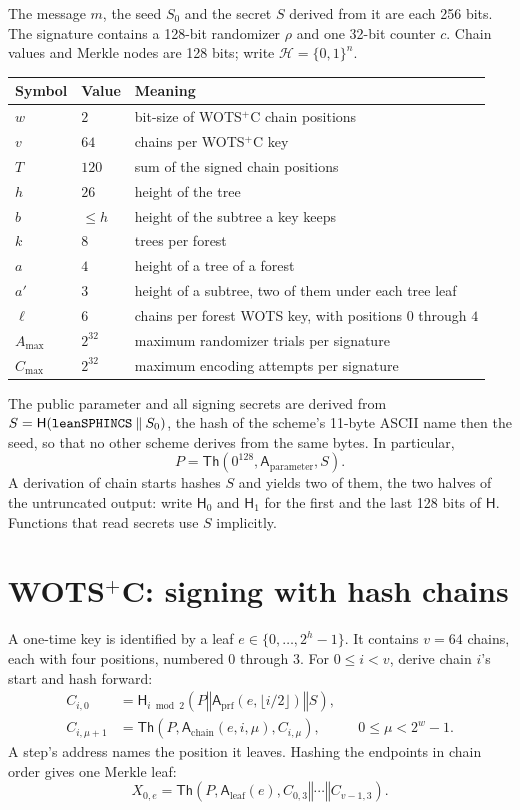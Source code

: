 \documentclass[11pt]{article}
\theoremstyle{plain}
\theoremstyle{definition}
\newcommand{\bits}[1]{\{0,1\}^{#1}}
\newcommand{\Th}{\mathsf{Th}}
\newcommand{\hash}{\mathsf{H}}
\newcommand{\concat}{\mathbin\Vert}
\newcommand{\addr}{\mathsf{A}}
\newcommand{\amax}{A_{\max}}
\newcommand{\cmax}{C_{\max}}
\begin{document}
The message $m$, the seed $S_0$ and the secret $S$ derived from it are each 256 bits. The signature contains a 128-bit randomizer $\rho$ and one 32-bit counter $c$. Chain values and Merkle nodes are 128 bits; write $\mathcal H=\bits n$.

\begin{center}
\begin{tabular}{@{}lll@{}}
\toprule
Symbol & Value & Meaning\\
\midrule
$w$ & $2$ & bit-size of WOTS$^+$C chain positions\\
$v$ & $64$ & chains per WOTS$^+$C key\\
$T$ & $120$ & sum of the signed chain positions\\
$h$ & $26$ & height of the tree\\
$b$ & $\leq h$ & height of the subtree a key keeps\\
$k$ & $8$ & trees per forest\\
$a$ & $4$ & height of a tree of a forest\\
$a'$ & $3$ & height of a subtree, two of them under each tree leaf\\
$\ell$ & $6$ & chains per forest WOTS key, with positions $0$ through $4$\\
$\amax$ & $2^{32}$ & maximum randomizer trials per signature\\
$\cmax$ & $2^{32}$ & maximum encoding attempts per signature\\
\bottomrule
\end{tabular}
\end{center}

The public parameter and all signing secrets are derived from $S=\hash(\text{\texttt{leanSPHINCS}}\concat S_0)$, the hash of the scheme's 11-byte ASCII name then the seed, so that no other scheme derives from the same bytes. In particular,
\[
  P=\Th\!\left(0^{128},\addr_{\mathrm{parameter}},S\right).
\]
A derivation of chain starts hashes $S$ and yields two of them, the two halves of the untruncated output: write $\hash_0$ and $\hash_1$ for the first and the last 128 bits of $\hash$. Functions that read secrets use $S$ implicitly.

\section{\texorpdfstring{WOTS$^+$C}{WOTS+C}: signing with hash chains}
\label{sec:ots}

A one-time key is identified by a leaf $e\in\{0,\ldots,2^h-1\}$. It contains $v=64$ chains, each with four positions, numbered $0$ through $3$. For $0\leq i<v$, derive chain $i$'s start and hash forward:
\[
\begin{aligned}
  C_{i,0}&=\hash_{i\bmod2}\!\left(P\concat\addr_{\mathrm{prf}}(e,\lfloor i/2\rfloor)\concat S\right),\\
  C_{i,\mu+1}&=\Th\!\left(P,\addr_{\mathrm{chain}}(e,i,\mu),C_{i,\mu}\right),
    &&0\leq\mu<2^w-1.
\end{aligned}
\]
A step's address names the position it leaves. Hashing the endpoints in chain order gives one Merkle leaf:
\[
  X_{0,e}=\Th\!\left(P,\addr_{\mathrm{leaf}}(e),C_{0,3}\concat\cdots\concat C_{v-1,3}\right).
\]
\end{document}
